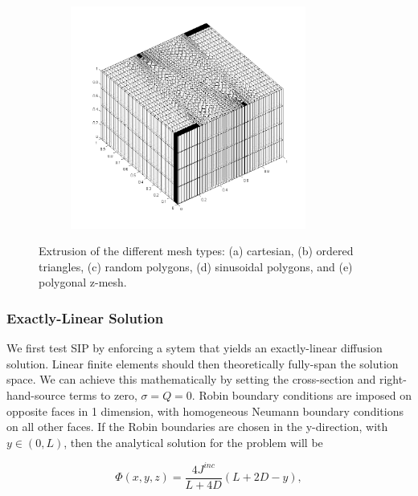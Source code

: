 \begin{figure}
\begin{subfigure}[b]{0.45\textwidth}
		\includegraphics[width=0.85\textwidth]{figures/sec_DSA/SIP_z_poly_extruded_mesh.png}
		\caption{}
	\end{subfigure}
\caption{Extrusion of the different mesh types: (a) cartesian, (b) ordered triangles, (c) random polygons, (d) sinusoidal polygons, and (e) polygonal z-mesh.}
\label{fig::SIP_mesh_extruded}
\end{figure}

\subsubsection{Exactly-Linear Solution}
\label{sec::DSA_Results_SIP_Linear}

We first test SIP by enforcing a sytem that yields an exactly-linear diffusion solution. Linear finite elements should then theoretically fully-span the solution space. We can achieve this mathematically by setting the cross-section and right-hand-source terms to zero, $\sigma = Q = 0$. Robin boundary conditions are imposed on opposite faces in 1 dimension, with homogeneous Neumann boundary conditions on all other faces. If the Robin boundaries are chosen in the y-direction, with $y \in (0,L)$, then the analytical solution for the problem will be 

\begin{equation}
\label{eq::SIP_mms_lin_solution}
\Phi(x,y,z) = \frac{4 J^{inc}}{L + 4D} \left(  L + 2 D - y \right),
\end{equation}

